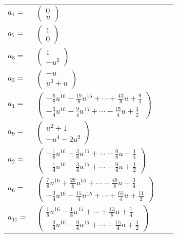 \documentclass[1p]{elsarticle_modified}
\theoremstyle{definition}
\begin{document}
\begin{tabular}{m{7pt} m{180pt} m{7pt} m{180pt} }
\flushright $a_{4}=$&$\begin{pmatrix}0\\u\end{pmatrix}$ \\
\flushright $a_{7}=$&$\begin{pmatrix}1\\0\end{pmatrix}$ \\
\flushright $a_{8}=$&$\begin{pmatrix}1\\- u^2\end{pmatrix}$ \\
\flushright $a_{3}=$&$\begin{pmatrix}- u\\u^3+u\end{pmatrix}$ \\
\flushright $a_{1}=$&$\begin{pmatrix}-\frac{5}{8} u^{16}-\frac{19}{8} u^{15}+\cdots+\frac{43}{8} u+\frac{9}{4}\\-\frac{3}{4} u^{16}-\frac{9}{4} u^{15}+\cdots+\frac{15}{4} u+\frac{1}{2}\end{pmatrix}$ \\
\flushright $a_{9}=$&$\begin{pmatrix}u^2+1\\- u^4-2 u^2\end{pmatrix}$ \\
\flushright $a_{2}=$&$\begin{pmatrix}-\frac{1}{8} u^{16}-\frac{3}{8} u^{15}+\cdots-\frac{9}{8} u-\frac{1}{4}\\-\frac{1}{4} u^{16}-\frac{3}{4} u^{15}+\cdots+\frac{9}{4} u+\frac{1}{2}\end{pmatrix}$ \\
\flushright $a_{6}=$&$\begin{pmatrix}\frac{7}{8} u^{16}+\frac{29}{8} u^{15}+\cdots-\frac{49}{8} u-\frac{3}{4}\\-\frac{3}{4} u^{16}-\frac{15}{4} u^{15}+\cdots+\frac{65}{4} u+\frac{11}{2}\end{pmatrix}$ \\
\flushright $a_{11}=$&$\begin{pmatrix}\frac{1}{8} u^{16}-\frac{1}{8} u^{15}+\cdots+\frac{13}{8} u+\frac{7}{4}\\-\frac{3}{4} u^{16}-\frac{9}{4} u^{15}+\cdots+\frac{15}{4} u+\frac{1}{2}\end{pmatrix}$ \\

\end{tabular}
\end{document}

